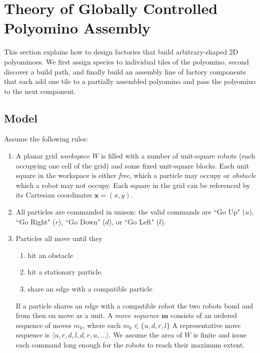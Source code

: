 \section{Theory of Globally Controlled Polyomino Assembly}\label{sec:Theory}

This section explains how to design factories that build arbitrary-shaped 2D polyominoes.
 We first assign species to individual tiles of the polyomino, second discover a build path, and finally build an assembly line of factory components that each add one tile to a partially assembled polyomino and pass the polyomino to the next component.



\subsection{Model}\label{subsec:model}
Assume the following rules:
\begin{enumerate}
\item A planar  grid \emph{workspace} $W$ is filled with a number of unit-square robots (each occupying one cell of the grid)  and some fixed unit-square blocks.  Each unit square in the workspace is either  \emph{free}, which a particle may occupy or \emph{obstacle} which a robot may not occupy.  Each square in the grid can be referenced by its Cartesian coordinates $\bm{x}=(x,y)$.
\item All particles are commanded in unison: the valid commands are  ``Go Up" ($u$), ``Go Right" ($r$), ``Go Down" ($d$), or ``Go Left" ($l$).  
\item Particles all move until they 
	\begin{enumerate}
		\item hit an obstacle 
		\item hit a stationary particle. 
		\item share an edge with a compatible particle
	\end{enumerate}
	If a particle shares an edge with a compatible robot the two robots bond and from then on move as a unit.
A \emph{move sequence} $\bm{m}$ consists of an ordered sequence of moves $m_k$, where each $m_k\in\{u,d,r,l\}$  A representative move sequence is $\langle u,r,d,l,d,r,u,\ldots\rangle$. We assume the area of $W$ is finite and issue each command long enough for the robots to reach their maximum extent.
\end{enumerate}


